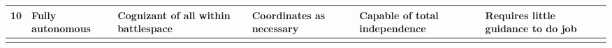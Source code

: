 \begin{table}
\begin{tabular}{r L{0.1\textwidth} L{0.175\textwidth} L{0.175\textwidth} L{0.175\textwidth} L{0.175\textwidth}}
        10  & Fully autonomous                              & Cognizant of all within battlespace                                                                                                                           & Coordinates as necessary                                                                                                                                                                                                      & Capable of total independence                                                                                                                  & Requires little guidance to do job \\
        \bottomrule\\
        \end{tabular}
\end{table}

